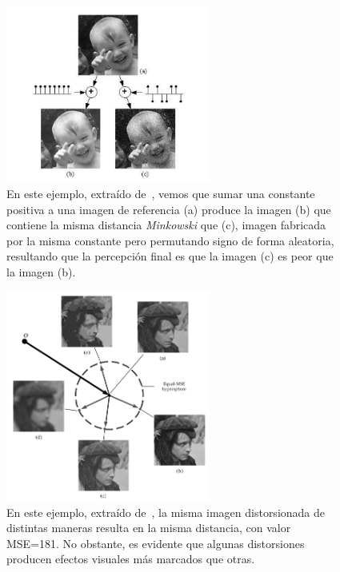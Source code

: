 \begin{figure}[htp]
  \begin{center}
    \includegraphics[width=0.6\textwidth]{imagenes/chapter2/failure_minkowski_metric.png}
  \end{center}
  \caption[Visualización del problema de la métrica \emph{Minkowski}.]{En este ejemplo, extraído de~\cite{MinkowskiFailure},
  vemos que sumar una constante positiva a una imagen  de referencia (a) produce la imagen (b) que contiene la misma distancia \emph{Minkowski}
  que (c), imagen fabricada por la misma constante pero permutando signo de forma aleatoria, resultando que
  la percepción final es que la imagen (c) es peor que la imagen (b).
\label{fig:FailureMinkowskiMetric}}
\end{figure}
\begin{figure}[htp]
  \begin{center}
    \includegraphics[width=0.6\textwidth]{imagenes/chapter2/MSE_Hypersphere.png}
  \end{center}
  \caption[Visualización del hiperplano MSE de imágenes distorsionadas.]{En este ejemplo, extraído de~\cite{Wang2006ModernIQ}, la misma imagen distorsionada de distintas 
    maneras resulta en la misma distancia, con valor MSE=181. 
    No obstante, es evidente que algunas distorsiones producen efectos visuales más marcados que otras.}
  \label{fig:MSEHyperSphere}
\end{figure}
 
